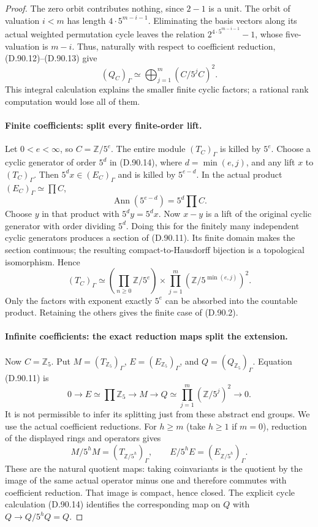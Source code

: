 \begin{proof}
The zero orbit contributes nothing, since \(2-1\) is a unit.
The orbit of valuation \(i<m\) has length
\(4\cdot5^{m-i-1}\). Eliminating the basis vectors along
its actual weighted permutation cycle leaves the relation
\(2^{4\cdot5^{m-i-1}}-1\), whose five-valuation is
\(m-i\). Thus, naturally with respect to coefficient
reduction, (D.90.12)--(D.90.13) give
\[
                  (Q_C)_\Gamma\simeq
                            \bigoplus_{j=1}^{m}(C/5^jC)^2.
                                                               \tag{D.90.14}
\]
This integral calculation explains the smaller finite cyclic
factors; a rational rank computation would lose all of them.

\paragraph{Finite coefficients: split every finite-order lift.}
Let \(0<e<\infty\), so \(C=\mathbb Z/5^e\).
The entire module \((T_C)_\Gamma\) is killed by \(5^e\).
Choose a cyclic generator of order \(5^d\) in (D.90.14),
where \(d=\min(e,j)\), and any lift \(x\) to
\((T_C)_\Gamma\). Then \(5^d x\in(E_C)_\Gamma\)
and is killed by \(5^{e-d}\). In the actual product
\((E_C)_\Gamma\simeq\prod C\),
\[
      \operatorname{Ann}(5^{e-d})=5^d\prod C.
\]
Choose \(y\) in that product with \(5^dy=5^dx\).
Now \(x-y\) is a lift of the original cyclic generator
with order dividing \(5^d\). Doing this for the finitely
many independent cyclic generators produces a section of
(D.90.11). Its finite domain makes the section continuous;
the resulting compact-to-Hausdorff bijection is a topological
isomorphism. Hence
\[
 (T_C)_\Gamma\simeq
       \left(\prod_{n\ge0}\mathbb Z/5^e\right)
             \times\prod_{j=1}^{m}(\mathbb Z/5^{\min(e,j)})^2.
                                                               \tag{D.90.15}
\]
Only the factors with exponent exactly \(5^e\) can be
absorbed into the countable product. Retaining the others
gives the finite case of (D.90.2).

\paragraph{Infinite coefficients: the exact reduction maps split the extension.}
Now \(C=\mathbb Z_5\). Put
\(M=(T_{\mathbb Z_5})_\Gamma\),
\(E=(E_{\mathbb Z_5})_\Gamma\), and
\(Q=(Q_{\mathbb Z_5})_\Gamma\). Equation (D.90.11) is
\[
 0\longrightarrow E\simeq\prod\mathbb Z_5
       \longrightarrow M\longrightarrow
       Q\simeq\prod_{j=1}^{m}(\mathbb Z/5^j)^2
                                  \longrightarrow0.    \tag{D.90.16}
\]
It is not permissible to infer its splitting just from these
abstract end groups. We use the actual coefficient reductions.
For \(h\ge m\) (take \(h\ge1\) if \(m=0\)), reduction
of the displayed rings and operators gives
\[
 M/5^hM=(T_{\mathbb Z/5^h})_\Gamma,
 \qquad E/5^hE=(E_{\mathbb Z/5^h})_\Gamma.              \tag{D.90.17}
\]
These are the natural quotient maps: taking coinvariants is
the quotient by the image of the same actual operator minus
one and therefore commutes with coefficient reduction.
That image is compact, hence closed. The explicit cycle
calculation (D.90.14) identifies the corresponding map on
\(Q\) with \(Q\to Q/5^hQ=Q\).


\end{proof}
